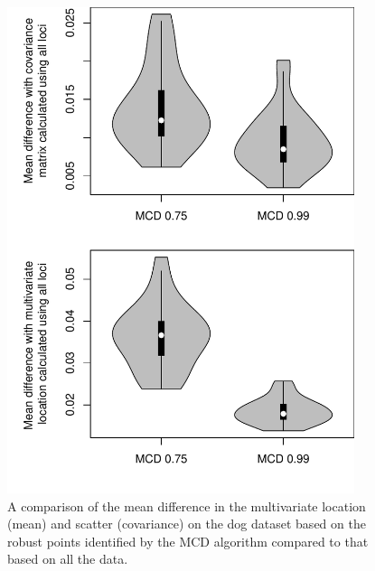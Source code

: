 \documentclass[12pt, oneside]{amsart}
\begin{document}
\newpage
\begin{figure}[h]
\begin{center}
\includegraphics[width=4in]{../figures_man2/S4-DogDataCompareLocationScatter.pdf}
\end{center}
\caption[]{A comparison of the mean difference in the multivariate location (mean) and scatter (covariance) on the dog dataset based on the robust points identified by the MCD algorithm compared to that based on all the data.} 
 \label{fig:???}
\end{figure}
\end{document}
